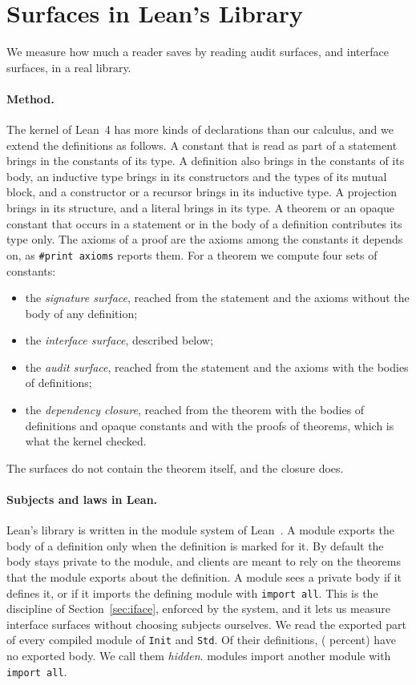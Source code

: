 \documentclass[acmsmall,nonacm,screen]{acmart}
\newcommand{\lean}[1]{\texttt{#1}}
\begin{document}
\section{Surfaces in Lean's Library}
\label{sec:measure}

We measure how much a reader saves by reading audit surfaces, and interface surfaces, in a real
library.

\paragraph{Method.}
The kernel of Lean~4 has more kinds of declarations than our calculus, and we extend the
definitions as follows. A constant that is read as part of a statement brings in the constants of
its type. A definition also brings in the constants of its body, an inductive type brings in its
constructors and the types of its mutual block, and a constructor or a recursor brings in its
inductive type. A projection brings in its structure, and a literal brings in its type. A theorem
or an opaque constant that occurs in a statement or in the body of a definition contributes its
type only. The axioms of a proof are the axioms among the constants it depends on, as
\lean{\#print axioms} reports them. For a theorem we compute four sets of constants:
\begin{itemize}
\item the \emph{signature surface}, reached from the statement and the axioms without the body of
  any definition;
\item the \emph{interface surface}, described below;
\item the \emph{audit surface}, reached from the statement and the axioms with the bodies of
  definitions;
\item the \emph{dependency closure}, reached from the theorem with the bodies of definitions and
  opaque constants and with the proofs of theorems, which is what the kernel checked.
\end{itemize}
The surfaces do not contain the theorem itself, and the closure does.

\paragraph{Subjects and laws in Lean.}
Lean's library is written in the module system of Lean~\citep{leanmodules}. A module exports the
body of a definition only when the definition is marked for it. By default the body stays
private to the module, and clients are meant to rely on the theorems that the module exports
about the definition. A module sees a private body if it defines it, or if it imports the
defining module with \lean{import all}. This is the discipline of Section~\ref{sec:iface},
enforced by the system, and it lets us measure interface surfaces without choosing subjects
ourselves. We read the exported part of every compiled module of \lean{Init} and \lean{Std}. Of
their \NumDefs{} definitions, \NumHiddenDefs{} (\HiddenPercent{} percent) have no exported body.
We call them \emph{hidden}. \NumImportAll{} modules import another module with
\lean{import all}.
\end{document}
